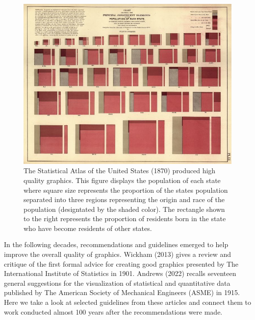 \documentclass[print]{nuthesis}
\begin{document}
\begin{figure}[tbp]

{\centering \includegraphics[width=0.85\linewidth,]{images/statistical-atlas-state-population} 

}

\caption[Statistical Atlas of the United States (1870)]{The Statistical Atlas of the United States (1870) produced high quality graphics. This figure displays the population of each state where square size represents the proportion of the states population separated into three regions representing the origin and race of the population (designtated by the shaded color). The rectangle shown to the right represents the proportion of residents born in the state who have become residents of other states.}\label{fig:statistical-atlas-state-population}
\end{figure}

In the following decades, recommendations and guidelines emerged to help improve the overall quality of graphics.
Wickham (2013) gives a review and critique of the first formal advice for creating good graphics presented by The International Institute of Statistics in 1901.
Andrews (2022) recalls seventeen general suggestions for the visualization of statistical and quantitative data published by The American Society of Mechanical Engineers (ASME) in 1915.
Here we take a look at selected guidelines from these articles and connect them to work conducted almost 100 years after the recommendations were made.
\end{document}
